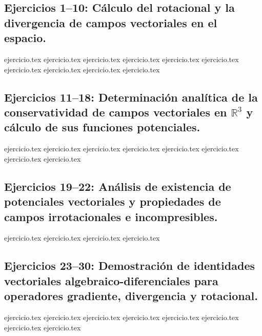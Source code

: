 
\subsection*{Ejercicios 1--10: Cálculo del rotacional y la divergencia de campos vectoriales en el espacio.}
\begin{enumerate}
    {ejercicio.tex}
    {ejercicio.tex}
    {ejercicio.tex}
    {ejercicio.tex}
    {ejercicio.tex}
    {ejercicio.tex}
    {ejercicio.tex}
    {ejercicio.tex}
    {ejercicio.tex}
    {ejercicio.tex}
\end{enumerate}

\subsection*{Ejercicios 11--18: Determinación analítica de la conservatividad de campos vectoriales en $\mathbb{R}^3$ y cálculo de sus funciones potenciales.}
\begin{enumerate}
    \setcounter{enumi}{10}
    {ejercicio.tex}
    {ejercicio.tex}
    {ejercicio.tex}
    {ejercicio.tex}
    {ejercicio.tex}
    {ejercicio.tex}
    {ejercicio.tex}
    {ejercicio.tex}
\end{enumerate}

\subsection*{Ejercicios 19--22: Análisis de existencia de potenciales vectoriales y propiedades de campos irrotacionales e incompresibles.}
\begin{enumerate}
    \setcounter{enumi}{18}
    {ejercicio.tex}
    {ejercicio.tex}
    {ejercicio.tex}
    {ejercicio.tex}
\end{enumerate}

\subsection*{Ejercicios 23--30: Demostración de identidades vectoriales algebraico-diferenciales para operadores gradiente, divergencia y rotacional.}
\begin{enumerate}
    \setcounter{enumi}{22}
    {ejercicio.tex}
    {ejercicio.tex}
    {ejercicio.tex}
    {ejercicio.tex}
    {ejercicio.tex}
    {ejercicio.tex}
    {ejercicio.tex}
    {ejercicio.tex}
\end{enumerate}

